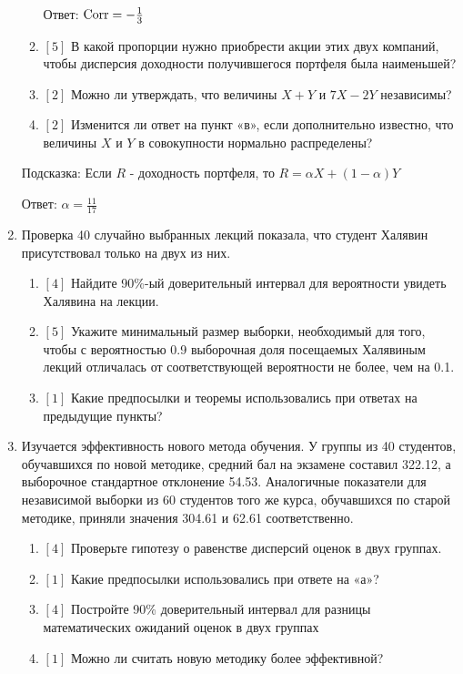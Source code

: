 \documentclass[12pt, a4paper]{article}\usepackage[]{graphicx}\usepackage[]{color}
\begin{document}
\begin{enumerate}
\begin{enumerate}
Ответ: $\operatorname{Corr}=-\frac{1}{3}$
\item $[5]$ В какой пропорции нужно приобрести акции этих двух
компаний, чтобы дисперсия доходности получившегося портфеля была наименьшей?
\item  $[2]$ Можно ли утверждать, что величины $X+Y$ и $7X-2Y$ независимы?
\item $[2]$ Изменится ли ответ на пункт «в», если дополнительно
известно, что величины $X$ и $Y$ в совокупности нормально распределены?
\end{enumerate}
Подсказка: Если $R$ - доходность портфеля, то $R=\alpha
X+(1-\alpha)Y$

Ответ: $\alpha=\frac{11}{17}$

\item Проверка 40 случайно выбранных лекций показала, что студент
Халявин присутствовал только на двух из них.
\begin{enumerate}
\item{} $[4]$ Найдите 90\%-ый доверительный интервал для вероятности
увидеть Халявина на лекции.
\item{} $[5]$ Укажите минимальный размер выборки, необходимый для того,
чтобы с вероятностью 0.9 выборочная доля посещаемых Халявиным
лекций отличалась от соответствующей вероятности не более, чем на 0.1.
\item{} $[1]$ Какие предпосылки и теоремы использовались при ответах на предыдущие пункты?
\end{enumerate}

\item Изучается эффективность нового метода обучения. У группы из 40
студентов, обучавшихся по новой методике, средний бал на экзамене
составил 322.12, а выборочное стандартное отклонение 54.53.
Аналогичные показатели для независимой выборки из 60 студентов
того же курса, обучавшихся по старой методике,
приняли значения 304.61 и 62.61 соответственно.
\begin{enumerate}
\item{} $[4]$ Проверьте гипотезу о равенстве дисперсий оценок в двух
группах.
\item{} $[1]$ Какие предпосылки использовались при ответе на «а»?
\item{} $[4]$ Постройте 90\% доверительный интервал для разницы
математических ожиданий оценок в двух группах
\item{} $[1]$ Можно ли считать новую методику более эффективной?
\end{enumerate}


\end{enumerate}
\end{document}
